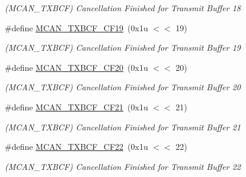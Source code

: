 \begin{DoxyCompactItemize}
\begin{DoxyCompactList}\small\item\em (M\+C\+A\+N\+\_\+\+T\+X\+B\+CF) Cancellation Finished for Transmit Buffer 18 \end{DoxyCompactList}\item 
\mbox{\label{group__SAME70__MCAN_gaf9f26b78d3ed296ae19145df6e770fef}} 
\#define \mbox{\hyperlink{group__SAME70__MCAN_gaf9f26b78d3ed296ae19145df6e770fef}{M\+C\+A\+N\+\_\+\+T\+X\+B\+C\+F\+\_\+\+C\+F19}}~(0x1u $<$$<$ 19)
\begin{DoxyCompactList}\small\item\em (M\+C\+A\+N\+\_\+\+T\+X\+B\+CF) Cancellation Finished for Transmit Buffer 19 \end{DoxyCompactList}\item 
\mbox{\label{group__SAME70__MCAN_ga6b91e503a90f1c37c6dd0384fcfe6c42}} 
\#define \mbox{\hyperlink{group__SAME70__MCAN_ga6b91e503a90f1c37c6dd0384fcfe6c42}{M\+C\+A\+N\+\_\+\+T\+X\+B\+C\+F\+\_\+\+C\+F20}}~(0x1u $<$$<$ 20)
\begin{DoxyCompactList}\small\item\em (M\+C\+A\+N\+\_\+\+T\+X\+B\+CF) Cancellation Finished for Transmit Buffer 20 \end{DoxyCompactList}\item 
\mbox{\label{group__SAME70__MCAN_ga5c7c6bddc443b1e6365ed3e70ded690e}} 
\#define \mbox{\hyperlink{group__SAME70__MCAN_ga5c7c6bddc443b1e6365ed3e70ded690e}{M\+C\+A\+N\+\_\+\+T\+X\+B\+C\+F\+\_\+\+C\+F21}}~(0x1u $<$$<$ 21)
\begin{DoxyCompactList}\small\item\em (M\+C\+A\+N\+\_\+\+T\+X\+B\+CF) Cancellation Finished for Transmit Buffer 21 \end{DoxyCompactList}\item 
\mbox{\label{group__SAME70__MCAN_ga15945f692bbca07eb99e0c0071acb387}} 
\#define \mbox{\hyperlink{group__SAME70__MCAN_ga15945f692bbca07eb99e0c0071acb387}{M\+C\+A\+N\+\_\+\+T\+X\+B\+C\+F\+\_\+\+C\+F22}}~(0x1u $<$$<$ 22)
\begin{DoxyCompactList}\small\item\em (M\+C\+A\+N\+\_\+\+T\+X\+B\+CF) Cancellation Finished for Transmit Buffer 22 \end{DoxyCompactList}\item 

\end{DoxyCompactItemize}
